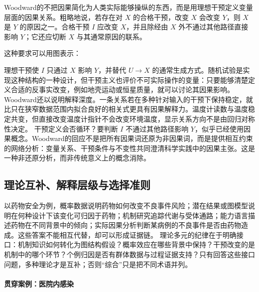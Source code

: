 Woodward的不把因果简化为人类实际能够操纵的东西，而是用理想干预定义变量层面的因果关系\parencite{woodward2003}。粗略地说，若存在对 $X$ 的合格干预，改变 $X$ 会改变 $Y$，则 $X$ 是 $Y$ 的原因之一。合格干预 $I$ 应改变 $X$，并且除经由 $X$ 外不通过其他路径直接影响 $Y$；它还应切断 $X$ 与其通常原因的联系。

这种要求可以用图表示：

\begin{center}
\end{center}

理想干预使 $I$ 只通过 $X$ 影响 $Y$，并替代 $U\rightarrow X$ 的通常生成方式。随机试验是实现这种结构的一种设计，但干预主义也评价不可实际操作的变量：只要能够清楚定义合适的反事实改变，例如地壳运动或恒星质量，就可以讨论其因果影响。
Woodward还以说明解释深度。一条关系若在多种针对输入的干预下保持稳定，就比只在狭窄数据范围内拟合良好的相关式更具有因果解释力。温度计读数与温度稳定共变，但直接改变温度计指针不会改变环境温度，显示关系方向不是由回归对称性决定。
干预定义会否循环？要判断 $I$ 不通过其他路径影响 $Y$，似乎已经使用因果概念。Woodward的回应不是把所有因果词还原为非因果词，而是提供相互约束的网络分析：变量关系、干预条件与不变性共同澄清科学实践中的因果主张。这是一种非还原分析，而非传统意义上的概念消除。

\subsection{理论互补、解释层级与选择准则}

以药物安全为例，概率数据说明药物如何改变不良事件风险；潜在结果或图模型说明在何种设计下该变化可归因于药物；机制研究追踪代谢与受体通路；能力语言描述药物在不同背景中的倾向；实际因果分析判断某病例的不良事件是否由药物造成。这些答案不能相互代替，却可以形成证据链。
理论多元的纪律在于明确接口：机制知识如何转化为图结构假设？概率效应在哪些背景中保持？干预改变的是机制中的哪个环节？个例归因是否有群体数据与过程证据支持？只有回答这些接口问题，多种理论才是互补；否则“综合”只是把不同术语并列。

\paragraph{贯穿案例：医院内感染}

